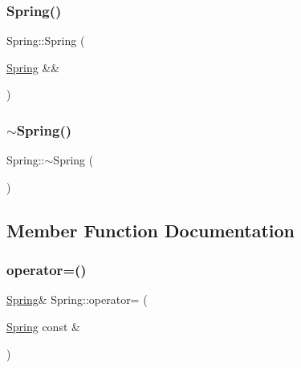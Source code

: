 \mbox{\label{classSpring_abe45ef79d37d2353383b4b24b38d7d88}} 
\subsubsection{\texorpdfstring{Spring()}{Spring()}\hspace{0.1cm}{\footnotesize\ttfamily [3/3]}}
{\footnotesize\ttfamily Spring\+::\+Spring (\begin{DoxyParamCaption}\item[{\hyperlink{classSpring}{Spring} \&\&}]{ }\end{DoxyParamCaption})\hspace{0.3cm}{\ttfamily [delete]}}

\mbox{\label{classSpring_a8b5c6088814c8e343be53682f33866f1}} 
\subsubsection{\texorpdfstring{$\sim$\+Spring()}{~Spring()}}
{\footnotesize\ttfamily Spring\+::$\sim$\+Spring (\begin{DoxyParamCaption}{ }\end{DoxyParamCaption})}



\subsection{Member Function Documentation}
\mbox{\label{classSpring_a3e15b14976e488d841565ed53a9b23ff}} 
\subsubsection{\texorpdfstring{operator=()}{operator=()}\hspace{0.1cm}{\footnotesize\ttfamily [1/2]}}
{\footnotesize\ttfamily \hyperlink{classSpring}{Spring}\& Spring\+::operator= (\begin{DoxyParamCaption}\item[{\hyperlink{classSpring}{Spring} const \&}]{ }\end{DoxyParamCaption})\hspace{0.3cm}{\ttfamily [delete]}}

